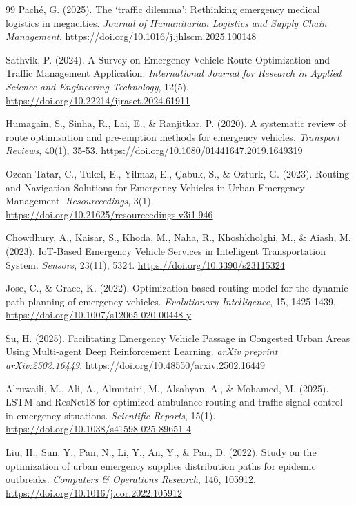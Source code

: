 \documentclass[paper=A4, 12pt, mathscr]{report}
\begin{document}
\begin{thebibliography}{99}
		 Paché, G. (2025). The `traffic dilemma': Rethinking emergency medical logistics in megacities. \textit{Journal of Humanitarian Logistics and Supply Chain Management}. \url{https://doi.org/10.1016/j.jhlscm.2025.100148}
		
		 Sathvik, P. (2024). A Survey on Emergency Vehicle Route Optimization and Traffic Management Application. \textit{International Journal for Research in Applied Science and Engineering Technology}, 12(5). \url{https://doi.org/10.22214/ijraset.2024.61911}
		
		 Humagain, S., Sinha, R., Lai, E., \& Ranjitkar, P. (2020). A systematic review of route optimisation and pre-emption methods for emergency vehicles. \textit{Transport Reviews}, 40(1), 35-53. \url{https://doi.org/10.1080/01441647.2019.1649319}
		
		 Ozcan-Tatar, C., Tukel, E., Yilmaz, E., Çabuk, S., \& Ozturk, G. (2023). Routing and Navigation Solutions for Emergency Vehicles in Urban Emergency Management. \textit{Resourceedings}, 3(1). \url{https://doi.org/10.21625/resourceedings.v3i1.946}
		
		 Chowdhury, A., Kaisar, S., Khoda, M., Naha, R., Khoshkholghi, M., \& Aiash, M. (2023). IoT-Based Emergency Vehicle Services in Intelligent Transportation System. \textit{Sensors}, 23(11), 5324. \url{https://doi.org/10.3390/s23115324}
		
		 Jose, C., \& Grace, K. (2022). Optimization based routing model for the dynamic path planning of emergency vehicles. \textit{Evolutionary Intelligence}, 15, 1425-1439. \url{https://doi.org/10.1007/s12065-020-00448-y}
		
		 Su, H. (2025). Facilitating Emergency Vehicle Passage in Congested Urban Areas Using Multi-agent Deep Reinforcement Learning. \textit{arXiv preprint arXiv:2502.16449}. \url{https://doi.org/10.48550/arxiv.2502.16449}
		
		 Alruwaili, M., Ali, A., Almutairi, M., Alsahyan, A., \& Mohamed, M. (2025). LSTM and ResNet18 for optimized ambulance routing and traffic signal control in emergency situations. \textit{Scientific Reports}, 15(1). \url{https://doi.org/10.1038/s41598-025-89651-4}
		
		 Liu, H., Sun, Y., Pan, N., Li, Y., An, Y., \& Pan, D. (2022). Study on the optimization of urban emergency supplies distribution paths for epidemic outbreaks. \textit{Computers \& Operations Research}, 146, 105912. \url{https://doi.org/10.1016/j.cor.2022.105912}
		

\end{thebibliography}
\end{document}
